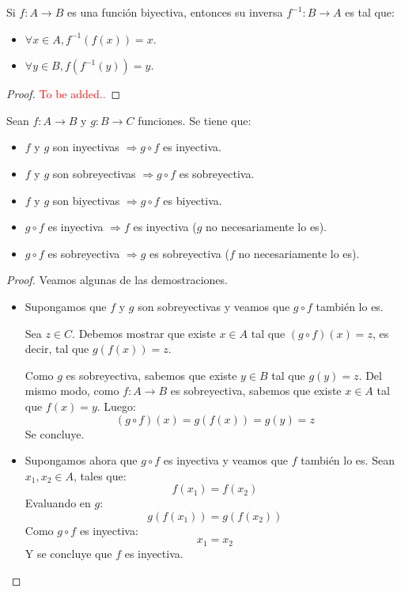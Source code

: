 \begin{proposicion}
	Si $f: A \rightarrow B$ es una función biyectiva, entonces su inversa $f^{-1}: B \rightarrow A$ es tal que: 
	\begin{itemize}
		\item $\forall x \in A, f^{-1}(f(x)) = x$. 
		\item $\forall y \in B, f(f^{-1}(y)) = y$. 
	\end{itemize}
\end{proposicion}

\begin{proof}
	\textcolor{red}{To be added..}
\end{proof}

\begin{proposicion}
	Sean $f: A \rightarrow B$ y $g: B \rightarrow C$ funciones. Se tiene que: 
	\begin{itemize}
		\item $f$ y $g$ son inyectivas $\Longrightarrow  g \circ f $ es inyectiva. 
		\item $f$ y $g$ son sobreyectivas $\Longrightarrow  g \circ f $ es sobreyectiva. 
		\item $f$ y $g$ son biyectivas $\Longrightarrow  g \circ f $ es biyectiva. 
		\item $g \circ f$ es inyectiva $\Longrightarrow f$ es inyectiva ($g$ no necesariamente lo es). 
		\item $g \circ f$ es sobreyectiva $\Longrightarrow g$ es sobreyectiva ($f$ no necesariamente lo es). 
	\end{itemize}
\end{proposicion}

\begin{proof}

	Veamos algunas de las demostraciones. 
	
	\begin{itemize}
		\item Supongamos que $f$ y $g$ son sobreyectivas y veamos que $g \circ f$ también lo es.  
		
		Sea $z \in C$. Debemos mostrar que existe $x \in A$ tal que $(g \circ f)(x) = z$, es decir, tal que $g(f(x)) = z$. 
		
		Como $g$ es sobreyectiva, sabemos que existe $y \in B $ tal que $g(y) = z$.  Del mismo modo, como $f: A \rightarrow B$ es sobreyectiva, sabemos que existe $x \in A $ tal que $f(x) = y$. Luego:
		$$ (g \circ f) (x) = g(f(x)) = g(y) = z $$ 
		Se concluye. 
		
		\item Supongamos ahora que $g \circ f$ es inyectiva y veamos que $f$ también lo es. Sean $x_1, x_2 \in A$, tales que: 
		$$ f(x_1) = f(x_2) $$  
		Evaluando en $g$: 
		$$ g(f(x_1)) = g(f(x_2)) $$ 
		Como $g\circ f$ es inyectiva: 
		$$ x_1 = x_2 $$  
		Y se concluye que $f$ es inyectiva. 
		
	\end{itemize}
\end{proof}

